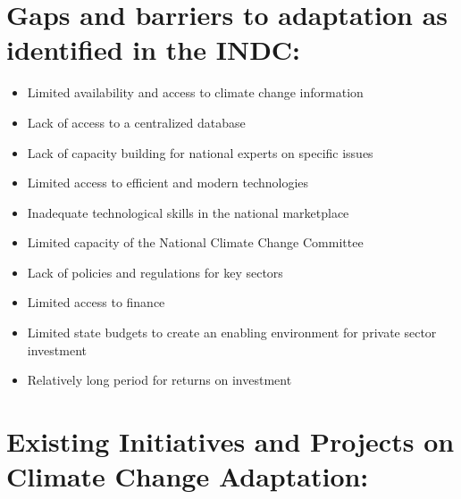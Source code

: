 \documentclass[
]{book}
\providecommand{\tightlist}{%
  \setlength{\itemsep}{0pt}\setlength{\parskip}{0pt}}
\begin{document}
\hypertarget{gaps-and-barriers-to-adaptation-as-identified-in-the-indc-1}{%
\section{Gaps and barriers to adaptation as identified in the INDC:}\label{gaps-and-barriers-to-adaptation-as-identified-in-the-indc-1}}

\begin{itemize}
\tightlist
\item
  Limited availability and access to climate change information\\
\item
  Lack of access to a centralized database
\item
  Lack of capacity building for national experts on specific issues
\item
  Limited access to efficient and modern technologies
\item
  Inadequate technological skills in the national marketplace
\item
  Limited capacity of the National Climate Change Committee
\item
  Lack of policies and regulations for key sectors
\item
  Limited access to finance
\item
  Limited state budgets to create an enabling environment for private sector investment
\item
  Relatively long period for returns on investment
\end{itemize}

\hypertarget{existing-initiatives-and-projects-on-climate-change-adaptation-1}{%
\section{Existing Initiatives and Projects on Climate Change Adaptation:}\label{existing-initiatives-and-projects-on-climate-change-adaptation-1}}

\providecommand{\docline}[3]{\noalign{\global\setlength{\arrayrulewidth}{#1}}\arrayrulecolor[HTML]{#2}\cline{#3}}

\setlength{\tabcolsep}{2pt}

\renewcommand*{\arraystretch}{1.5}
\end{document}
